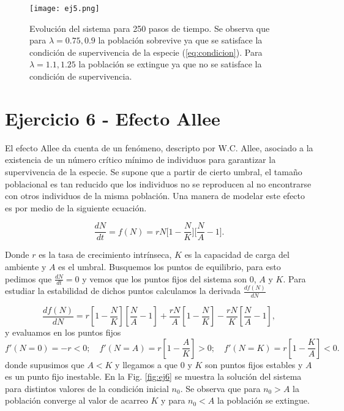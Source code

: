 \documentclass[letterpaper,12pt]{article}
\theoremstyle{plain}
\begin{document}
\begin{figure}[h]
    \centering
    \texttt{[image: ej5.png]}
    \caption{Evolución del sistema para 250 pasos de tiempo. Se observa que para $\lambda = 0.75,0.9$ la población sobrevive ya que se satisface la condición de supervivencia de la especie (\ref*{eq:condicion}). Para $\lambda = 1.1,1.25$ la población se extingue ya que no se satisface la condición de supervivencia.}
    \label{fig:ej5}
\end{figure}

\section*{Ejercicio 6 - Efecto Allee}

El efecto Allee da cuenta de un fenómeno, descripto por W.C. Allee, asociado a la existencia de un número crítico mínimo de individuos para garantizar la supervivencia de la especie. Se supone que a partir de cierto umbral, el tamaño poblacional es tan reducido que los individuos no se reproducen al no encontrarse con otros individuos de la misma población. Una manera de modelar este efecto es por medio de la siguiente ecuación. 

\begin{equation}
    \frac{dN}{dt} = f(N) = rN \biggr[ 1 - \frac{N}{K} \biggr] \biggr[ \frac{N}{A} -1 \biggr]. 
\end{equation}

Donde $r$ es la tasa de crecimiento intrínseca, $K$ es la capacidad de carga del ambiente y $A$ es el umbral. Busquemos los puntos de equilibrio, para esto pedimos que $\frac{dN}{dt} = 0$ y vemos que los puntos fijos del sistema son $0$, $A$ y $K$. Para estudiar la estabilidad de dichos puntos calculamos la derivada $\frac{df(N)}{d N}$ 

\begin{equation*}
    \frac{df(N)}{dN} = r \left[ 1-\frac{N}{K} \right] \left[ \frac{N}{A} -1 \right] + \frac{rN}{A} \left[ 1 - \frac{N}{K} \right] - \frac{rN}{K} \left[ \frac{N}{A}-1\right],
\end{equation*}
y evaluamos en los puntos fijos
\begin{equation*}
    f'(N=0) = -r < 0; \quad  f'(N=A)=r\left[1-\frac{A}{K}\right] > 0; \quad f'(N=K)=r\left[1-\frac{K}{A}\right] < 0. 
\end{equation*}
donde supusimos que $A<K$ y llegamos a que $0$ y $K$ son puntos fijos estables y $A$ es un punto fijo inestable. En la Fig. \ref*{fig:ej6} se muestra la solución del sistema para distintos valores de la condición inicial $n_0$. Se observa que para $n_0>A$ la población converge al valor de acarreo $K$ y para $n_0<A$ la población se extingue.
\end{document}
